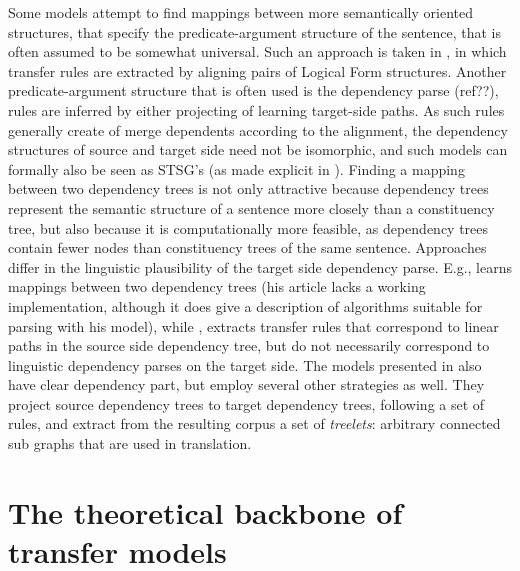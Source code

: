 \documentclass{report}
\theoremstyle{definition}
\theoremstyle{plain}
\begin{document}
Some models attempt to find mappings between more semantically oriented structures, that specify the predicate-argument structure of the sentence, that is often assumed to be somewhat universal. Such an approach is taken in \cite{menezes2003best}, in which transfer rules are extracted by aligning pairs of Logical Form structures. Another predicate-argument structure that is often used is the dependency parse (ref??), rules are inferred by either projecting of learning target-side paths. As such rules generally create of merge dependents according to the alignment, the dependency structures of source and target side need not be isomorphic, and such models can formally also be seen as STSG's (as made explicit in \cite{eisner2003learning}). Finding a mapping between two dependency trees is not only attractive because dependency trees represent the semantic structure of a sentence more closely than a constituency tree, but also because it is computationally more feasible, as dependency trees contain fewer nodes than constituency trees of the same sentence. Approaches differ in the linguistic plausibility of the target side dependency parse. E.g., \cite{eisner2003learning} learns mappings between two dependency trees (his article lacks a working implementation, although it does give a description of algorithms suitable for parsing with his model), while  \cite{lin2004path}, extracts transfer rules that correspond to linear paths in the source side dependency tree, but do not necessarily correspond to linguistic dependency parses on the target side. The models presented in \cite{quirk2005dependency,quirk2006dependency,quirk2006we} also have clear dependency part, but employ several other strategies as well. They project source dependency trees to target dependency trees, following a set of rules, and extract from the resulting corpus a set of \textit{treelets}: arbitrary connected sub graphs that are used in translation.



%
%

\chapter{The theoretical backbone of transfer models}
\end{document}
